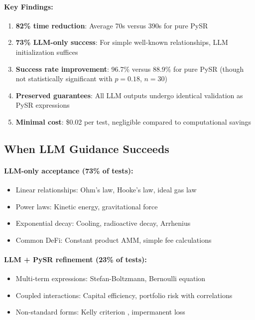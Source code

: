 \documentclass[twoside,11pt]{article}
\begin{document}
\paragraph{Key Findings:}

\begin{enumerate}
\item \textbf{82\% time reduction}: Average 70s versus 390s for pure PySR
\item \textbf{73\% LLM-only success}: For simple well-known relationships, LLM initialization suffices
\item \textbf{Success rate improvement}: 96.7\% versus 88.9\% for pure PySR (though not statistically significant with $p = 0.18$, $n = 30$)
\item \textbf{Preserved guarantees}: All LLM outputs undergo identical validation as PySR expressions
\item \textbf{Minimal cost}: \$0.02 per test, negligible compared to computational savings
\end{enumerate}

\subsection{When LLM Guidance Succeeds}

\paragraph{LLM-only acceptance (73\% of tests):}
\begin{itemize}
\item Linear relationships: Ohm's law, Hooke's law, ideal gas law
\item Power laws: Kinetic energy, gravitational force
\item Exponential decay: Cooling, radioactive decay, Arrhenius
\item Common DeFi: Constant product AMM, simple fee calculations
\end{itemize}

\paragraph{LLM + PySR refinement (23\% of tests):}
\begin{itemize}
\item Multi-term expressions: Stefan-Boltzmann, Bernoulli equation
\item Coupled interactions: Capital efficiency, portfolio risk with correlations
\item Non-standard forms: Kelly criterion \citep{kelly1956criterion}, impermanent loss
\end{itemize}
\end{document}
